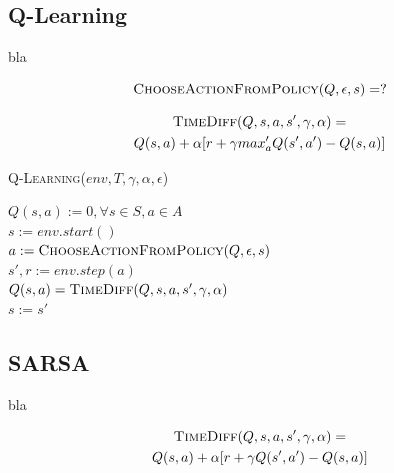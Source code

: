 \documentclass[letterpaper]{article}
\begin{document}
\subsection{Q-Learning}

bla

\begin{equation} \label{eq:epsilon_greedy_action}
  \textsc{ChooseActionFromPolicy}(Q, \epsilon, s) = ?
\end{equation}

\begin{multline} \label{eq:time_diff_update_q_learning}
  \textsc{TimeDiff}(Q, s, a, s', \gamma, \alpha) = \\ 
      Q(s,a) + \alpha [r + \gamma max_a' Q(s', a') - Q(s,a)]
\end{multline}

\linesnumbered
\dontprintsemicolon
\begin{algorithm}[t!]
{
	\caption{\textsc{Q-Learning}($ env, T, \gamma, \alpha, \epsilon $)}
	\label{alg:q-learning}
    $Q(s,a) := 0, \forall s \in S, a \in A $\\

    {
      $s := env.start()$\\

      {
        $a := \textsc{ChooseActionFromPolicy}(Q, \epsilon, s) $\\
        $s', r := env.step(a)$\\
        $Q(s, a) = \textsc{TimeDiff}(Q, s, a, s', \gamma, \alpha)$\\
        $s := s'$ \\
      }
    }

}
\end{algorithm}

\subsection{SARSA}

bla

\begin{multline} \label{eq:time_diff_update_sarsa}
  \textsc{TimeDiff}(Q, s, a, s', \gamma, \alpha) = \\ 
      Q(s,a) + \alpha [r + \gamma Q(s', a') - Q(s,a)]
\end{multline}
\end{document}
